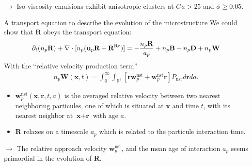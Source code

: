 \documentclass{sintefbeamer}
\begin{document}
\begin{frame}
$\to$ Iso-viscosity emulsions exhibit anisotropic clusters at $Ga > 25$ and $\phi \ge 0.05$.  

\end{frame}

\begin{frame}
  {A transport equation to describe the evolution of the microstructure}
  We could show that $\textbf{R}$ obeys the transport equation: 
\begin{equation*}
    \partial_t (n_p\textbf{R})
    + \mathbf{\nabla}\cdot [
      n_p(\textbf{u}_p\textbf{R}
    + \textbf{R}^\text{Re})]
    = 
    - \frac{n_p\textbf{R}}{a_p}
    +n_p\textbf{B}
    + n_p\textbf{D}
    + n_p\textbf{W}
\end{equation*}
With the ``relative velocity production term''
\begin{align*}
    n_p \textbf{W}(\textbf{x},t) = 
    \int_{0}^\infty
    \int_{\mathbb{R}^3} \left[
        \textbf{r} \textbf{w}^\text{nst}_p
        + \textbf{w}^\text{nst}_p\textbf{r}
    \right]P_\text{nst}
    d\textbf{r}
    da.
\end{align*} 

\begin{itemize}
  \item  $\textbf{w}^\text{nst}_p(\textbf{x},\textbf{r},t,a)$ is the averaged relative velocity between two nearest neighboring particules, one of which is situated at $\textbf{x}$ and time $t$, with its nearest neighbor at $\textbf{x}+\textbf{r}$ with age $a$. 
  \item \textbf{R} relaxes on a timescale $a_p$ which is related to the particule interaction time.
\end{itemize}

$\to$ The relative approach velocity $\textbf{w}^\text{nst}_p$, and the mean age of interaction $a_p$ seems primordial in the evolution of \textbf{R}. 

\end{frame}
\end{document}
